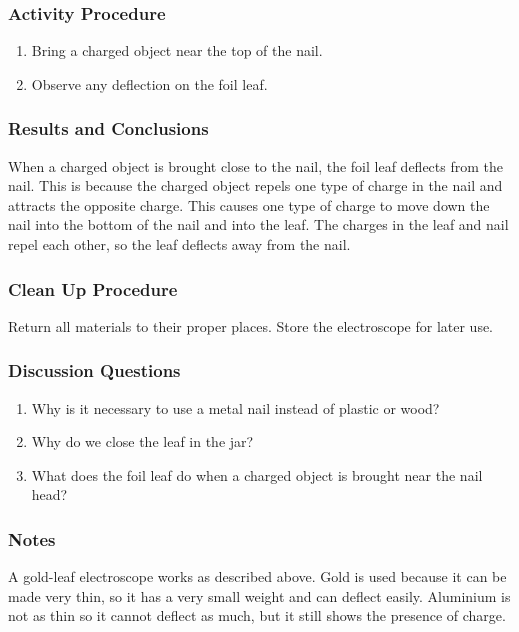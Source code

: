 \subsubsection*{Activity Procedure}
\begin{enumerate}
\item{Bring a charged object near the top of the nail.} 
\item{Observe any deflection on the foil leaf.} 
\end{enumerate}

\subsubsection*{Results and Conclusions}
When a charged object is brought close to the nail, the foil leaf deflects from the nail. This is because the charged object repels one type of charge in the nail and attracts the opposite charge. This causes one type of charge to move down the nail into the bottom of the nail and into the leaf. The charges in the leaf and nail repel each other, so the leaf deflects away from the nail. 

\subsubsection*{Clean Up Procedure}
Return all materials to their proper places. Store the electroscope for later use.

\subsubsection*{Discussion Questions}
\begin{enumerate}
\item{Why is it necessary to use a metal nail instead of plastic or wood?}
\item{Why do we close the leaf in the jar?}
\item{What does the foil leaf do when a charged object is brought near the nail head?}
\end{enumerate}

\subsubsection*{Notes}
A gold-leaf electroscope works as described above. Gold is used because it can be made very thin, so it has a very small weight and can deflect easily. Aluminium is not as thin so it cannot deflect as much, but it still shows the presence of charge. 


